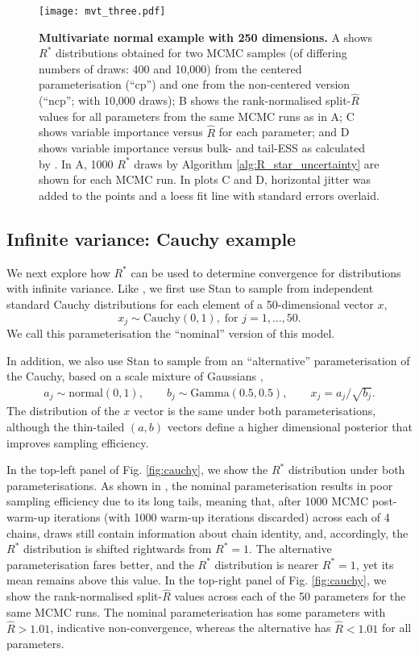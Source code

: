 \documentclass{article}
\begin{document}
\begin{figure}[!htb]
	\centerline{\texttt{[image: mvt\_three.pdf]}}
	\caption{\textbf{Multivariate normal example with 250 dimensions.} A shows $R^*$ distributions obtained for two MCMC samples (of differing numbers of draws: 400 and 10,000) from the centered parameterisation (``cp'') and one from the non-centered version (``ncp''; with 10,000 draws); B shows the rank-normalised split-$\widehat{R}$ values for all parameters from the same MCMC runs as in A; C shows variable importance versus $\widehat{R}$ for each parameter; and D shows variable importance versus bulk- and tail-ESS as calculated by \cite{vehtari2019rank}. In A, 1000 $R^*$ draws by Algorithm \ref{alg:R_star_uncertainty} are shown for each MCMC run. In plots C and D, horizontal jitter was added to the points and a loess fit line with standard errors overlaid.}
	\label{fig:mvt}
\end{figure}

\subsection{Infinite variance: Cauchy example}\label{sec:cauchy}
We next explore how $R^*$ can be used to determine convergence for distributions with infinite variance. Like \cite{vehtari2019rank}, we first use Stan to sample from independent standard Cauchy distributions for each element of a 50-dimensional vector $x$,
%
\begin{equation}
x_j\sim \text{Cauchy}(0, 1),\; \text{for } j=1,...,50.
\end{equation}
%
We call this parameterisation the ``nominal'' version of this model.

In addition, we also use Stan to sample from an ``alternative'' parameterisation of the Cauchy, based on a scale mixture of Gaussians \citep{vehtari2019rank},
%
\begin{align}
a_j \sim  \text{normal}(0,1), \qquad
b_j \sim  \text{Gamma}(0.5, 0.5), \qquad
x_j =  a_j/\sqrt{b_j}.
\end{align}
%
The distribution of the $x$ vector is the same under both parameterisations, although the thin-tailed $(a,b)$ vectors define a higher dimensional posterior that improves sampling efficiency.

In the top-left panel of Fig. \ref{fig:cauchy}, we show the $R^*$ distribution under both parameterisations. As shown in \cite{vehtari2019rank}, the nominal parameterisation results in poor sampling efficiency due to its long tails, meaning that, after 1000 MCMC post-warm-up iterations (with 1000 warm-up iterations discarded) across each of 4 chains, draws still contain information about chain identity, and, accordingly, the $R^*$ distribution is shifted rightwards from $R^*=1$. The alternative parameterisation fares better, and the $R^*$ distribution is nearer $R^*=1$, yet its mean remains above this value. In the top-right panel of Fig. \ref{fig:cauchy}, we show the rank-normalised split-$\widehat{R}$ values across each of the 50 parameters for the same MCMC runs. The nominal parameterisation has some parameters with $\widehat{R}>1.01$, indicative non-convergence, whereas the alternative has $\widehat{R}<1.01$ for all parameters.
\end{document}
